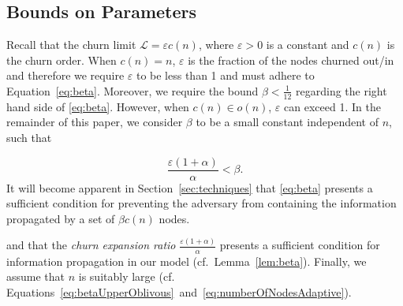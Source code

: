 \documentclass[leqno,11pt]{article}
\newcommand{\eps}{\varepsilon}
\renewcommand{\L}{{\mathcal{L}}}
\begin{document}
\subsection*{Bounds on Parameters}
Recall that the churn limit $\L = \eps c(n)$, where $\eps > 0$ is a constant and $c(n)$ is the churn order. When $c(n) = n$,  $\eps$ is the fraction of the nodes churned out/in and therefore we require $\eps$  to be less than 1 and must adhere to Equation~\eqref{eq:beta}.
Moreover, we require the bound $\beta < \frac{1}{12}$ regarding the right hand side of \eqref{eq:beta}.
However, when $c(n) \in o(n)$,  $\eps$ can exceed 1. In the remainder of this paper, we consider $\beta$ to be a  small
constant independent of $n$, such that

\begin{equation} \label{eq:beta}
  \frac{\eps (1 + \alpha)}{\alpha} < \beta.
\end{equation}
It will become apparent in Section~\ref{sec:techniques} that \eqref{eq:beta} presents a sufficient condition for preventing the adversary from containing the information propagated by a set of $\beta c(n)$ nodes.

and that the \emph{churn expansion ratio}
$\frac{\eps(1 + \alpha)}{\alpha}$ presents a sufficient condition for information
propagation in our model (cf.\ Lemma~\ref{lem:beta}).
Finally, we assume that $n$ is suitably large (cf. Equations~\ref{eq:betaUpperOblivous}~and~\ref{eq:numberOfNodesAdaptive}). 
\end{document}
